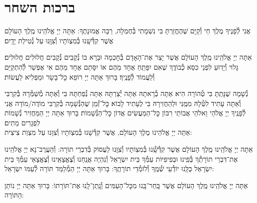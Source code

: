 \documentclass[twoside, openany, parskip=half, 11pt]{book}
\begin{document}
\vspace*{\fill}


\centerlast

\chapter[ברכות השחר]{ ברכות השחר }

\renewcommand{\thefootnote}{\roman{footnote}} %
\setlength{\parskip}{0.75em}

\newcommand{\na}{\begin{large}
‏‍ְ
\end{large}}

אֲנִי לְ֯פָנֶיךָ מֶלֶךְ חַי וְ֯קַיָּם שֶׁהֶחֱזַרְתָּ בִּי נִשְׁמָתִי בְּ֯חֶמְלָה, רַבָּה אֱמוּנָתֶךָ:
אַתָּה יְיָ אֱלֹהֵֽינוּ מֶֽלֶךְ הָעוֹלָם אֲשֶׁר קִדְּ֯שָֽׁנוּ בְּ֯מִצְוֹתָיו וְ֯צִוָּֽנוּ עַל נְ֯טִילַת יָדָֽיִם׃

אַתָּה יְיָ אֱלֹהֵֽינוּ מֶֽלֶךְ הָעוֹלָם אֲשֶׁר יָצַר אֶת־הָאָדָם בְּ֯חׇכְמָה וּבָרָא בוֹ נְ֯קָבִים נְ֯קָבִים חֲלוּלִים חֲלוּלִים׃ גָּלוּי וְ֯יָדֽוּעַ לִפְנֵי כִסֵּא כְ֯בוֹדֶֽךָ שֶׁאִם יִפָּתֵֽחַ אֶחָד מֵהֶם אוֹ יִסָּתֵם אֶחָד מֵהֶם אִי אֶפְשַׁר לְ֯הִתְקַיֵּם וְ֯לַעֲמוֹד לְ֯פָנֶֽיךָ׃ בָּרוּךְ אַתָּה יְיָ רוֹפֵא כׇל־בָּשָׂר וּמַפְלִיא לַעֲשׂוֹת׃


נְ֯שָׁמָה שֶׁנָּתַֽתָּ בִּי טְ֯הוֹרָה הִיא׃ אַתָּה בְ֯רָאתָהּ אַתָּה יְ֯צַרְתָּהּ אַתָּה נְ֯פַחְתָּהּ בִּי וְ֯אַתָּה מְ֯שַׁמְּ֯רָהּ בְּ֯קִרְבִּי וְ֯אַתָּה עָתִיד לִטְּ֯לָהּ מִמֶּֽנִּי וּלְהַחֲזִירָהּ בִּי לֶעָתִיד לָבוֹא׃ כׇּל־זְ֯מַן שֶׁהַנְּ֯שָׁמָה בְּ֯קִרְבִּי מוֹדֶה/מוֹדָה אֲנִי לְ֯פָנֶֽיךָ יְיָ אֱלֹהַי וֵאלֹהֵי אֲבוֹתַי רִבּוֹן כׇּל־הַמַּעֲשִׂים אֲדוֹן כׇּל־הַנְּ֯שָׁמוֹת׃ בָּרוּךְ אַתָּה יְיָ הַמַּחֲזִיר נְ֯שָׁמוֹת לִפְגָרִים מֵתִים׃\\
אַתָּה יְיָ אֱלֹהֵינוּ מֶלֶךְ הָעוֹלָם, אֲשֶׁר קִדְּ֯שָׁנוּ בְּ֯מִצְוֹתָיו וְ֯צִוָּנוּ עַל מִצְוַת צִיצִית:

אַתָּה יְיָ אֱלֹהֵֽינוּ מֶֽלֶךְ הָעוֹלָם אֲשֶׁר קִדְּ֯שָֽׁ֯נוּ בְּ֯מִצְוֹתָיו וְ֯צִוָּֽנוּ לַעֲסוֹק בְּ֯דִבְרֵי תוֹרָה: וְ֯הַעֲרֶב־נָא יְיָ אֱלֹהֵֽינוּ אֶת־דִּבְרֵי תוֹרָתְ֯ךָ בְּ֯פִֽינוּ וּבְפִיפִיּוֹת עַמְּ֯ךָ בֵּית יִשְׂרָאֵל וְ֯נִהְיֶה אֲנַֽחְנוּ וְ֯צֶאֱצָאֵֽינוּ וְ֯צֶאֱצָאֵי עַמְּ֯ךָ בֵּית יִשְׂרָאֵל כֻּלָּֽנוּ יוֹדְ֯עֵי שְׁ֯מֶֽךָ וְ֯לוֹמְ֯דֵי תוֹרָתֶֽךָ: בָּרוּךְ אַתָּה יְיָ הַמְ֯לַמֵּד תּוֹרָה לְ֯עַמּוֹ יִשְׂרָאֵל:

אַתָּה יְיָ אֱלֹהֵֽינוּ מֶֽלֶךְ הָעוֹלָם אֲשֶׁר בָּֽחַר־בָּֽנוּ מִכׇּל־הָעַמִּים וְ֯נָֽתַן־לָֽנוּ אֶת־תּוֹרָתוֹ: בָּרוּךְ אַתָּה יְיָ נוֹתֵן הַתּוֹרָה:
\end{document}
